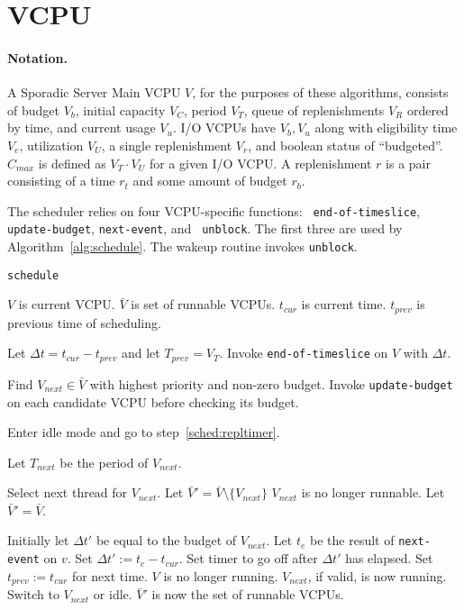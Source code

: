 \documentclass[twocolumn,10pt]{article}
\begin{document}
\newpage
\section{VCPU}
\newcommand\algorithmsize\small
\paragraph{Notation.} A Sporadic Server Main VCPU $V$, for the purposes
of these algorithms, consists of budget $V_b$, initial capacity $V_C$,
period $V_T$, queue of replenishments $V_R$ ordered by time, and
current usage $V_u$.  I/O VCPUs have $V_b, V_u$ along with eligibility
time $V_e$, utilization $V_U$, a single replenishment $V_r$, and
boolean status of ``budgeted''.  $C_{max}$ is defined as $V_T\cdot
V_U$ for a given I/O VCPU.  A replenishment $r$ is a pair consisting
of a time $r_t$ and some amount of budget $r_b$.

The scheduler relies on four VCPU-specific functions: {\tt
  end-of-timeslice}, {\tt update-budget}, {\tt next-event}, and {\tt
  unblock}.  The first three are used by Algorithm~\ref{alg:schedule}.
The wakeup routine invokes {\tt unblock}.

\begin{algorithm}[!htb]
  \caption{\tt schedule}\label{alg:schedule}
  \begin{algorithmic}[1]\algorithmsize
    \REQUIRE $V$ is current VCPU.
    \REQUIRE $\bar V$ is set of runnable VCPUs.
    \REQUIRE $t_{cur}$ is current time.
    \REQUIRE $t_{prev}$ is previous time of scheduling.

    \STATE Let $\Delta t=t_{cur}-t_{prev}$ and let $T_{prev}=V_T$.
    \STATE Invoke {\tt end-of-timeslice} on $V$ with $\Delta t$.

    \STATE Find $V_{next}\in\bar V$ with highest priority and
    non-zero budget. Invoke {\tt update-budget} on each candidate VCPU
    before checking its budget.

    \STATE Enter idle mode and go to step~\ref{sched:repltimer}.
    \ENDIF

    \STATE Let $T_{next}$ be the period of $V_{next}$.

    \STATE Select next thread for $V_{next}$.
    \STATE Let $\bar V'=\bar V\setminus\{V_{next}\}$
    \STATE $V_{next}$ is no longer runnable.
    \ELSE
    \STATE Let $\bar V'=\bar V$.
    \ENDIF

    \STATE Initially let $\Delta t'$ be equal to the budget of $V_{next}$.
    \STATE Let $t_e$ be the result of {\tt next-event} on $v$.
    \STATE Set $\Delta t':=t_e-t_{cur}$.\ENDIF
    \ENDFOR
    \STATE Set timer to go off after $\Delta t'$ has elapsed.
    \STATE Set $t_{prev}:=t_{cur}$ for next time.
    \STATE $V$ is no longer running.  $V_{next}$, if valid, is now running.
    \STATE Switch to $V_{next}$ or idle.
    \ENSURE $\bar V'$ is now the set of runnable VCPUs.
  \end{algorithmic}
\end{algorithm}
\end{document}
